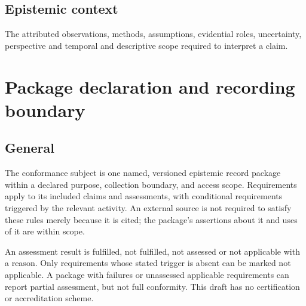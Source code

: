 \documentclass[11pt,a4paper]{article}
\begin{document}
\subsection{Epistemic context}
The attributed observations, methods, assumptions, evidential roles, uncertainty, perspective and temporal and descriptive scope required to interpret a claim.

\section{Package declaration and recording boundary}
\subsection{General}

The conformance subject is one named, versioned epistemic record package within a declared purpose, collection boundary, and access scope. Requirements apply to its included claims and assessments, with conditional requirements triggered by the relevant activity. An external source is not required to satisfy these rules merely because it is cited; the package's assertions about it and uses of it are within scope.



An assessment result is fulfilled, not fulfilled, not assessed or not applicable with a reason. Only requirements whose stated trigger is absent can be marked not applicable. A package with failures or unassessed applicable requirements can report partial assessment, but not full conformity. This draft has no certification or accreditation scheme.
\end{document}
